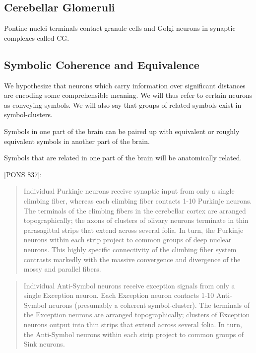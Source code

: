 \documentclass{article}
\begin{document}
\subsection{Cerebellar Glomeruli}

Pontine nuclei terminals contact granule cells and Golgi neurons in
synaptic complexes called CG.

\subsection{Symbolic Coherence and Equivalence}

We hypothesize that neurons which carry information over significant
distances are encoding some comprehensible meaning. We will thus refer
to certain neurons as conveying symbols. We will also say that groups
of related symbols exist in symbol-clusters.

\begin{conj} Symbols in one part of
  the brain can be paired up with equivalent or roughly equivalent
  symbols in another part of the brain.
\end{conj}

\begin{conj} Symbols that are related
  in one part of the brain will be anatomically related.
\end{conj}


[PONS 837]:
\begin{quote}
  Individual Purkinje neurons receive synaptic input from only a
  single climbing fiber, whereas each climbing fiber contacts 1-10
  Purkinje neurons. The terminals of the climbing fibers in the
  cerebellar cortex are arranged topographically; the axons of
  clusters of olivary neurons terminate in thin parasagittal strips
  that extend across several folia. In turn, the Purkinje neurons
  within each strip project to common groups of deep nuclear
  neurons. This highly specific connectivity of the climbing fiber
  system contrasts markedly with the massive convergence and
  divergence of the mossy and parallel fibers.
\end{quote}

\begin{quote}
Individual Anti-Symbol neurons receive exception signals from only a
single Exception neuron. Each Exception neuron contacts 1-10
Anti-Symbol neurons (presumably a coherent symbol-cluster). The
terminals of the Exception neurons are arranged topographically;
clusters of Exception neurons output into thin strips that extend
across several folia. In turn, the Anti-Symbol neurons within each
strip project to common groups of Sink neurons. 
\end{quote}
\end{document}
